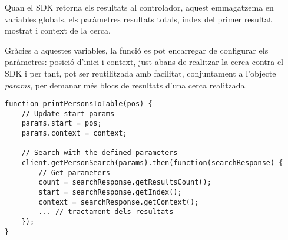 Quan el SDK retorna els resultats al controlador, aquest emmagatzema en variables globals, els paràmetres resultats totals, índex del primer resultat mostrat i context de la cerca.

Gràcies a aquestes variables, la funció es pot encarregar de configurar els paràmetres: posició d'inici i context, just abans de realitzar la cerca contra el SDK i per tant, pot ser reutilitzada amb facilitat, conjuntament a l'objecte \emph{params}, per demanar més blocs de resultats d'una cerca realitzada.

\begin{lstlisting}[style=rawOwn,caption={Actualització i utilització dels parametres \emph{count}, \emph{start} i \emph{context}}]
function printPersonsToTable(pos) {
    // Update start params
    params.start = pos;
    params.context = context;

    // Search with the defined parameters
    client.getPersonSearch(params).then(function(searchResponse) {
        // Get parameters
        count = searchResponse.getResultsCount();
        start = searchResponse.getIndex();
        context = searchResponse.getContext();
        ... // tractament dels resultats
    });
}
\end{lstlisting}
